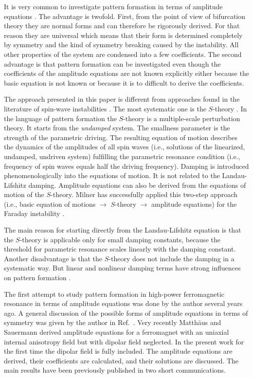 It is very common to investigate pattern formation in terms of 
amplitude equations \cite{cro.93,man.90}. The advantage is twofold.
First, from the point of view of bifurcation theory they are normal 
forms and can therefore be rigorously derived. For that reason they
are universal which means that their form is determined completely by
symmetry and the kind of symmetry breaking caused by the instability.
All other properties of the system are condensed into a few
coefficients.  The second advantage is that pattern formation can be
investigated even though the coefficients of the amplitude equations
are not known explicitly either because the basic equation is not
known or because it is to difficult to derive the coefficients. 

The approach presented in this paper is different from approaches
found in the literature of spin-wave instabilities \cite{wig.94}.
The most systematic one is the $S$-theory \cite{zak.75,lvo.94}. In
the language of pattern formation the $S$-theory is a multiple-scale
perturbation theory. It starts from the {\em undamped\/} system. The
smallness parameter is the strength of the parametric driving. The
resulting equation of motion describes the dynamics of the amplitudes
of all spin waves (i.e., solutions of the linearized, undamped, 
undriven system) fulfilling the parametric resonance condition (i.e.,
frequency of spin waves equals half the driving frequency). Damping
is introduced phenomenologically into the equations of motion. It is
not related to the Landau-Lifshitz damping. Amplitude equations can
also be derived from the equations of motion of the $S$-theory.
Milner has successfully applied this two-step approach (i.e., basic
equation of motions $\to$ $S$-theory $\to$ amplitude equations) for
the Faraday instability \cite{mil.91}. 

The main reason for starting directly from the Landau-Lifshitz
equation is that the $S$-theory is applicable only for small damping
constants, because the threshold for parametric resonance scales
linearly with the damping constant. Another disadvantage is that the
$S$-theory does not include the damping in a systematic way. But
linear and nonlinear damping terms have strong influences on pattern
formation \cite{mil.91}. 

The first attempt to study pattern formation in high-power
ferromagnetic resonance in terms of amplitude equations was done by
the author several years ago\cite{elm.87,elm.88}.  A general
discussion of the possible forms of amplitude equations in terms of
symmetry was given by the author in Ref.~. Very
recently Matth\"aus and Sauermann derived amplitude equations for a
ferromagnet with an uniaxial internal anisotropy field but with
dipolar field neglected\cite{mat.95}. In the present work for the
first time the dipolar field is fully included. The amplitude
equations are derived, their coefficients are calculated, and their
solutions are discussed.  The main results have been previously
published in two short communications\cite{elm.93,elm.95}.

